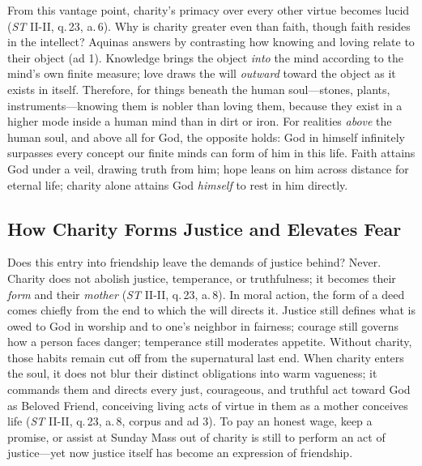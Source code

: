From this vantage point, charity's primacy over every other virtue becomes lucid (\emph{ST} II-II, q.\,23, a.\,6). Why is charity greater even than faith, though faith resides in the intellect? Aquinas answers by contrasting how knowing and loving relate to their object (ad 1). Knowledge brings the object \emph{into} the mind according to the mind's own finite measure; love draws the will \emph{outward} toward the object as it exists in itself. Therefore, for things beneath the human soul---stones, plants, instruments---knowing them is nobler than loving them, because they exist in a higher mode inside a human mind than in dirt or iron. For realities \emph{above} the human soul, and above all for God, the opposite holds: God in himself infinitely surpasses every concept our finite minds can form of him in this life. Faith attains God under a veil, drawing truth from him; hope leans on him across distance for eternal life; charity alone attains God \emph{himself} to rest in him directly.

\subsection*{How Charity Forms Justice and Elevates Fear}

Does this entry into friendship leave the demands of justice behind? Never. Charity does not abolish justice, temperance, or truthfulness; it becomes their \emph{form} and their \emph{mother} (\emph{ST} II-II, q.\,23, a.\,8). In moral action, the form of a deed comes chiefly from the end to which the will directs it. Justice still defines what is owed to God in worship and to one's neighbor in fairness; courage still governs how a person faces danger; temperance still moderates appetite. Without charity, those habits remain cut off from the supernatural last end. When charity enters the soul, it does not blur their distinct obligations into warm vagueness; it commands them and directs every just, courageous, and truthful act toward God as Beloved Friend, conceiving living acts of virtue in them as a mother conceives life (\emph{ST} II-II, q.\,23, a.\,8, corpus and ad 3). To pay an honest wage, keep a promise, or assist at Sunday Mass out of charity is still to perform an act of justice---yet now justice itself has become an expression of friendship.

